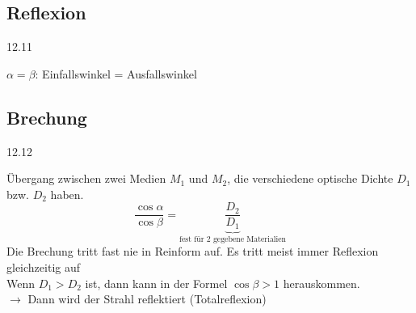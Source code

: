 \subsection{Reflexion}
\begin{center}
 12.11
\end{center}
$\alpha = \beta$: Einfallswinkel = Ausfallswinkel

\subsection{Brechung}
\begin{center}
 12.12
\end{center}
Übergang zwischen zwei Medien $M_1$ und $M_2$, die verschiedene optische Dichte $D_1$ bzw. $D_2$ haben.
\[\frac{\cos \alpha}{\cos \beta} = \underbrace{\frac{D_2}{D_1}}_{\text{fest für 2 gegebene Materialien}}\]
Die Brechung tritt fast nie in Reinform auf. Es tritt meist immer Reflexion gleichzeitig auf\\
Wenn $D_1 > D_2$ ist, dann kann in der Formel $\cos \beta > 1$ herauskommen.\\
$\rightarrow$ Dann wird der Strahl reflektiert (Totalreflexion)
